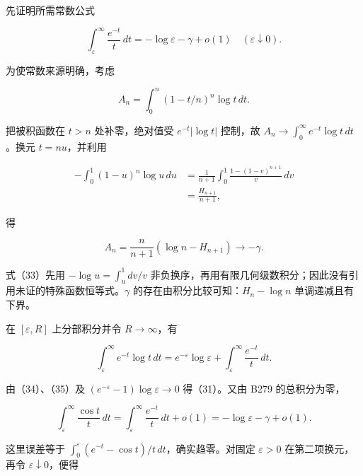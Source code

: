 \documentclass[11pt,a4paper]{article}
\begin{document}
先证明所需常数公式

\begin{equation}
\int_\varepsilon^\infty\frac{e^{-t}}t\,dt
=-\log\varepsilon-\gamma+o(1)
\quad(\varepsilon\downarrow0).
\tag{31}
\end{equation}

为使常数来源明确，考虑

\begin{equation}
A_n=\int_0^n(1-t/n)^n\log t\,dt.
\tag{32}
\end{equation}

把被积函数在 \(t>n\) 处补零，绝对值受 \(e^{-t}|\log t|\) 控制，故
\(A_n\to\int_0^\infty e^{-t}\log t\,dt\)。换元 \(t=nu\)，并利用

\begin{equation}
\begin{aligned}
-\int_0^1(1-u)^n\log u\,du
&=\frac1{n+1}\int_0^1\frac{1-(1-v)^{n+1}}v\,dv\\
&=\frac{H_{n+1}}{n+1},
\end{aligned}
\tag{33}
\end{equation}

得

\begin{equation}
A_n=\frac n{n+1}(\log n-H_{n+1})\longrightarrow-\gamma.
\tag{34}
\end{equation}

式（33）先用 \(-\log u=\int_u^1dv/v\)
非负换序，再用有限几何级数积分；因此没有引用未证的特殊函数恒等式。\(\gamma\)
的存在由积分比较可知：\(H_n-\log n\) 单调递减且有下界。

在 \([\varepsilon,R]\) 上分部积分并令 \(R\to\infty\)，有

\begin{equation}
\int_\varepsilon^\infty e^{-t}\log t\,dt
=e^{-\varepsilon}\log\varepsilon+
\int_\varepsilon^\infty\frac{e^{-t}}t\,dt.
\tag{35}
\end{equation}

由（34）、（35）及 \((e^{-\varepsilon}-1)\log\varepsilon\to0\)
得（31）。又由 B279 的总积分为零，

\begin{equation}
\int_\varepsilon^\infty\frac{\cos t}t\,dt
=\int_\varepsilon^\infty\frac{e^{-t}}t\,dt+o(1)
=-\log\varepsilon-\gamma+o(1).
\tag{36}
\end{equation}

这里误差等于
\(\int_0^\varepsilon(e^{-t}-\cos t)/t\,dt\)，确实趋零。对固定
\(\varepsilon>0\) 在第二项换元，再令 \(\varepsilon\downarrow0\)，便得
\end{document}

